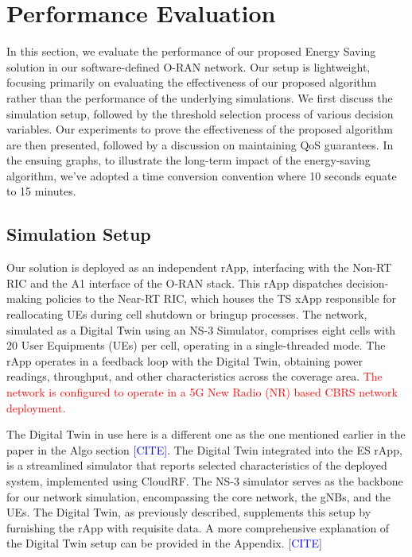 \section{Performance Evaluation}
\label{sec:results}

In this section, we evaluate the performance of our proposed Energy Saving solution in our software-defined O-RAN network. 
Our setup is lightweight, focusing primarily on evaluating the effectiveness of our proposed algorithm rather than the performance of the underlying simulations.
We first discuss the simulation setup, followed by the threshold selection process of various decision variables. 
Our experiments to prove the effectiveness of the proposed algorithm are then presented, followed by a discussion on maintaining QoS guarantees.
In the ensuing graphs, to illustrate the long-term impact of the energy-saving algorithm, we've adopted a time conversion convention where 10 seconds equate to 15 minutes. 

\subsection{Simulation Setup}
Our solution is deployed as an independent rApp, interfacing with the Non-RT RIC and the A1 interface of the O-RAN stack. 
This rApp dispatches decision-making policies to the Near-RT RIC, which houses the TS xApp responsible for reallocating UEs during cell shutdown or bringup processes.
The network, simulated as a Digital Twin using an NS-3 Simulator, comprises eight cells with 20 User Equipments (UEs) per cell, operating in a single-threaded mode.
The rApp operates in a feedback loop with the Digital Twin, obtaining power readings, throughput, and other characteristics across the coverage area.
\textcolor{red}{The network is configured to operate in a 5G New Radio (NR) based CBRS network deployment.}

The Digital Twin in use here is a different one as the one mentioned earlier in the paper in the Algo section \textcolor{blue}{[CITE]}.
The Digital Twin integrated into the ES rApp, is a streamlined simulator that reports selected characteristics of the deployed system, implemented using CloudRF.
The NS-3 simulator serves as the backbone for our network simulation, encompassing the core network, the gNBs, and the UEs. 
The Digital Twin, as previously described, supplements this setup by furnishing the rApp with requisite data.
A more comprehensive explanation of the Digital Twin setup can be provided in the Appendix. [\textcolor{blue}{CITE}]

